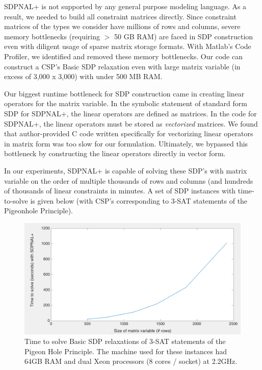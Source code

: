 \documentclass[12pt]{article} %
\begin{document}
SDPNAL+ is not supported by any general purpose modeling language. As a result, we needed to build all constraint matrices directly. Since constraint matrices of the types we consider have millions of rows and columns, severe memory bottlenecks (requiring $>$ 50 GB RAM) are faced in SDP construction even with diligent usage of sparse matrix storage formats. With Matlab's Code Profiler, we identified and removed these memory bottlenecks. Our code can construct a CSP's Basic SDP relaxation even with large matrix variable (in excess of 3,000 x 3,000) with under 500 MB RAM. 

Our biggest runtime bottleneck for SDP construction came in creating linear operators for the matrix variable. In the symbolic statement of standard form SDP for SDPNAL+, the linear operators are defined as matrices. In the code for SDPNAL+, the linear operators must be stored as \textit{vectorized} matrices. We found that author-provided C code written specifically for vectorizing linear operators in matrix form was too slow for our formulation. Ultimately, we bypassed this bottleneck by constructing the linear operators directly in vector form.

In our experiments, SDPNAL+ is capable of solving these SDP's with matrix variable on the order of multiple thousands of rows and columns (and hundreds of thousands of linear constraints in minutes. A set of SDP instances with time-to-solve is given below (with CSP's corresponding to 3-SAT statements of the Pigeonhole Principle).

\begin{figure}[ht!]
\includegraphics[width=\textwidth]{images/runtime}
\caption{Time to solve Basic SDP relaxations of 3-SAT statements of the Pigeon Hole Principle. The machine used for these instances had 64GB RAM and dual Xeon processors (8 cores / socket) at 2.2GHz.}
\end{figure}
\end{document}
